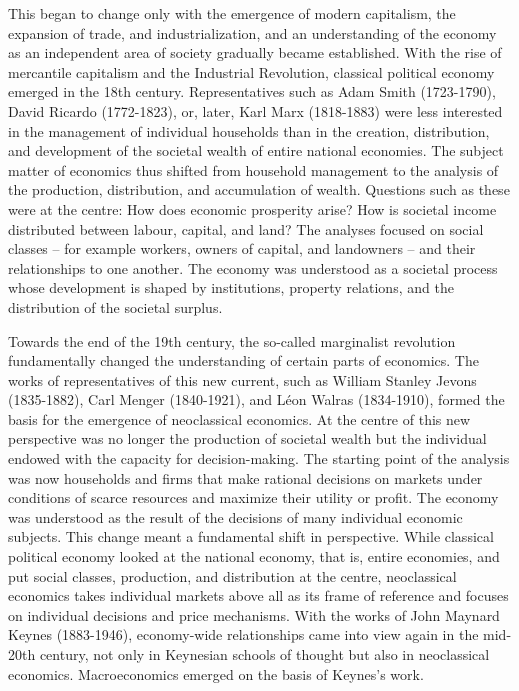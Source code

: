 \documentclass[
  british,
  a4paper,
  DIV=11,
  numbers=noendperiod,
  oneside,
  openany]{scrreprt}
\begin{document}
This began to change only with the emergence of modern capitalism, the
expansion of trade, and industrialization, and an understanding of the
economy as an independent area of society gradually became established.
With the rise of mercantile capitalism and the Industrial Revolution,
classical political economy emerged in the 18th century. Representatives
such as Adam Smith (1723-1790), David Ricardo (1772-1823), or, later,
Karl Marx (1818-1883) were less interested in the management of
individual households than in the creation, distribution, and
development of the societal wealth of entire national economies. The
subject matter of economics thus shifted from household management to
the analysis of the production, distribution, and accumulation of
wealth. Questions such as these were at the centre: How does economic
prosperity arise? How is societal income distributed between labour,
capital, and land? The analyses focused on social classes -- for example
workers, owners of capital, and landowners -- and their relationships to
one another. The economy was understood as a societal process whose
development is shaped by institutions, property relations, and the
distribution of the societal surplus.

Towards the end of the 19th century, the so-called marginalist
revolution fundamentally changed the understanding of certain parts of
economics. The works of representatives of this new current, such as
William Stanley Jevons (1835-1882), Carl Menger (1840-1921), and Léon
Walras (1834-1910), formed the basis for the emergence of neoclassical
economics. At the centre of this new perspective was no longer the
production of societal wealth but the individual endowed with the
capacity for decision-making. The starting point of the analysis was now
households and firms that make rational decisions on markets under
conditions of scarce resources and maximize their utility or profit. The
economy was understood as the result of the decisions of many individual
economic subjects. This change meant a fundamental shift in perspective.
While classical political economy looked at the national economy, that
is, entire economies, and put social classes, production, and
distribution at the centre, neoclassical economics takes individual
markets above all as its frame of reference and focuses on individual
decisions and price mechanisms. With the works of John Maynard Keynes
(1883-1946), economy-wide relationships came into view again in the
mid-20th century, not only in Keynesian schools of thought but also in
neoclassical economics. Macroeconomics emerged on the basis of Keynes's
work.
\end{document}
